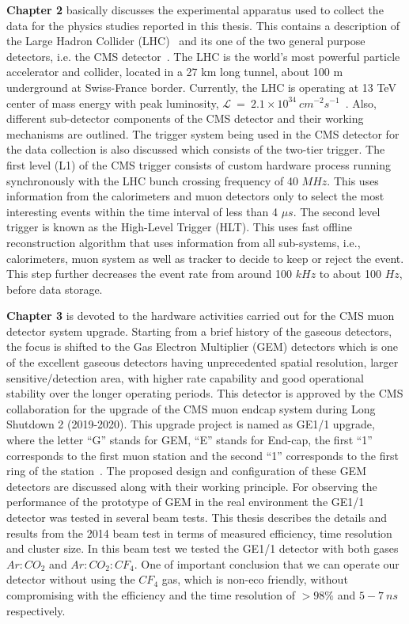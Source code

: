 \textbf{Chapter 2} basically discusses the experimental apparatus used to collect the data for the physics studies reported in this thesis. This contains a description of the Large Hadron Collider (LHC)~\cite{LHC-tdr-vol2,LHC-tdr-vol3,LHC-tdr-vol1} and its one of the two general purpose detectors, i.e. the CMS detector~\cite{paper:JINST:CMSCollaboration}. The LHC is the world's most powerful particle accelerator and collider, located in a 27 km long tunnel, about 100 m underground at Swiss-France border. Currently, the LHC is operating at 13 TeV center of mass energy with peak luminosity, $\mathcal{L}~=~2.1 \times 10^{34}~cm^{-2}s^{-1}$~\cite{cms-lumi-public-results,Muratori2006}. Also, different sub-detector components of the CMS detector and their working mechanisms are outlined. The trigger system being used in the CMS detector for the data collection is also discussed which consists of the two-tier trigger. The first level (L1) of the CMS trigger consists of custom hardware process running synchronously with the LHC bunch crossing frequency of 40 $MHz$. This uses information from the calorimeters and muon detectors only to select the most interesting events within the time interval of less than 4 $\mu s$. The second level trigger is known as the High-Level Trigger (HLT). This uses fast offline reconstruction algorithm that uses information from all sub-systems, i.e., calorimeters, muon system as well as tracker to decide to keep or reject the event. This step further decreases the event rate from around 100 $kHz$ to about 100 $Hz$, before data storage.

\textbf{Chapter 3} is devoted to the hardware activities carried out for the CMS muon detector system upgrade. Starting from a brief history of the gaseous detectors, the focus is shifted to the Gas Electron Multiplier (GEM) detectors which is one of the excellent gaseous detectors having unprecedented spatial resolution, larger sensitive/detection area, with higher rate capability and good operational stability over the longer operating periods. This detector is approved by the CMS collaboration for the upgrade of the CMS muon endcap system during Long Shutdown 2 (2019-2020). This upgrade project is named as GE1/1 upgrade, where the letter ``G'' stands for GEM, ``E'' stands for End-cap, the first ``1'' corresponds to the first muon station and the second ``1'' corresponds to the first ring of the station~\cite{Colaleo:2021453}. The proposed design and configuration of these GEM detectors are discussed along with their working principle. For observing the performance of the prototype of GEM in the real environment the GE1/1 detector was tested in several beam tests. This thesis describes the details and results from the 2014 beam test in terms of measured efficiency, time resolution and cluster size. In this beam test we tested the GE1/1 detector with both gases $Ar:CO_2$ and $Ar:CO_2:CF_4$. One of important conclusion that we can operate our detector without using the $CF_4$ gas, which is non-eco friendly, without compromising with the efficiency and the time resolution of $>98\%$ and $5-7~ns$ respectively.

